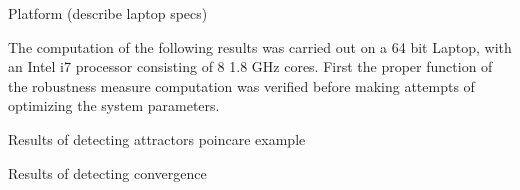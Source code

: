     Platform (describe laptop specs)

    The computation of the following results was carried out on a 64 bit Laptop, with an Intel i7 processor consisting of 8 1.8 GHz cores. 
    First the proper function of the robustness measure computation was verified before making attempts of optimizing the system parameters.   

    Results of detecting attractors
        poincare example

    Results of detecting convergence
    \

